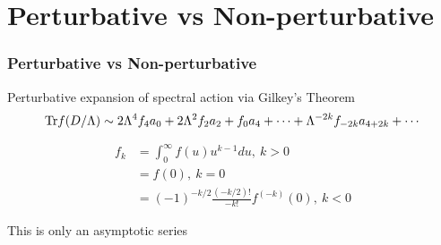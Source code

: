 \documentclass{beamer}
\def\Tr{{\rm Tr}}
\begin{document}
\section{Perturbative vs Non-perturbative}

\begin{frame}
	\frametitle{Perturbative vs Non-perturbative}
	\begin{block}{Perturbative expansion of spectral action via Gilkey's Theorem}
		\[
			\Tr f (D/\Lambda) \sim 2 \Lambda^4 f_4 a_0 + 2 \Lambda^2 f_2 a_2 + f_0 a_4 + \cdots + \Lambda^{-2k} f_{-2k} a_{4+2k} + \cdots
		\]

		\begin{align*}
			f_k &= \int_{0}^{\infty} f(u) u^{k-1} du, ~ k>0 \\
			&= f(0), ~ k = 0\\
			&= (-1)^{-k/2} \frac{(-k/2)!}{-k!}f^{(-k)}(0), ~ k < 0
		\end{align*}
	\end{block}

	\pause

	\begin{alertblock}{This is only an asymptotic series}

	\end{alertblock}
\end{frame}
\end{document}
